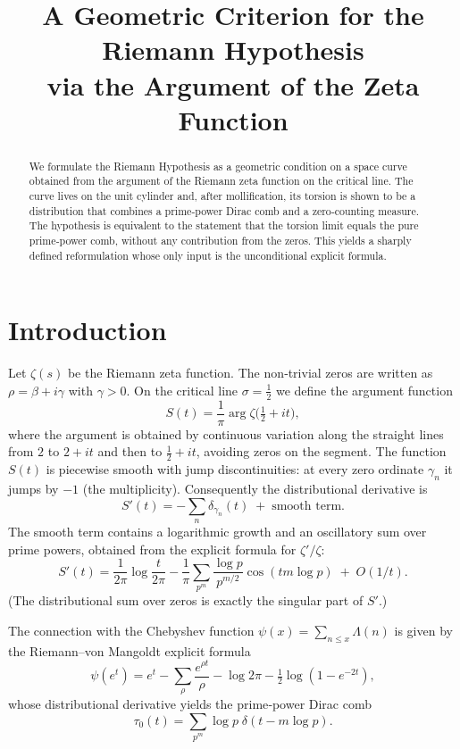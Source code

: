 \documentclass[12pt,a4paper]{article}
\title{\bf A Geometric Criterion for the Riemann Hypothesis\\ via the Argument of the Zeta Function}
\author{}
\date{}
\begin{document}
\maketitle

\begin{abstract}
We formulate the Riemann Hypothesis as a geometric condition on a space curve obtained from
the argument of the Riemann zeta function on the critical line.  The curve lives on the unit
cylinder and, after mollification, its torsion is shown to be a distribution that combines a
prime‑power Dirac comb and a zero‑counting measure.  The hypothesis is equivalent to the
statement that the torsion limit equals the pure prime‑power comb, without any contribution
from the zeros.  This yields a sharply defined reformulation whose only input is the
unconditional explicit formula.
\end{abstract}

\section{Introduction}

Let \(\zeta(s)\) be the Riemann zeta function.  The non‑trivial zeros are written as
\(\rho = \beta + i\gamma\) with \(\gamma>0\).  On the critical line \(\sigma = \tfrac12\) we
define the argument function
\[
S(t) = \frac1\pi \arg\zeta\bigl(\tfrac12+it\bigr),
\]
where the argument is obtained by continuous variation along the straight lines from \(2\) to
\(2+it\) and then to \(\tfrac12+it\), avoiding zeros on the segment.  The function \(S(t)\) is
piecewise smooth with jump discontinuities: at every zero ordinate \(\gamma_n\) it jumps by
\(-1\) (the multiplicity).  Consequently the distributional derivative is
\[
S'(t) = -\sum_{n} \delta_{\gamma_n}(t) \;+\; \text{smooth term}.
\]
The smooth term contains a logarithmic growth and an oscillatory sum over prime powers,
obtained from the explicit formula for \(\zeta'/\zeta\):
\[
S'(t) = \frac{1}{2\pi}\log\frac{t}{2\pi}
        -\frac1\pi \sum_{p^m}\frac{\log p}{p^{m/2}}\cos(t m\log p) \;+\; O(1/t).
\]
(The distributional sum over zeros is exactly the singular part of \(S'\).)

The connection with the Chebyshev function \(\psi(x)=\sum_{n\le x}\Lambda(n)\) is given by the
Riemann–von Mangoldt explicit formula
\[
\psi(e^t) = e^t - \sum_{\rho}\frac{e^{\rho t}}{\rho}
            - \log 2\pi - \tfrac12\log(1-e^{-2t}),
\]
whose distributional derivative yields the prime‑power Dirac comb
\[
\tau_0(t) = \sum_{p^m} \log p\; \delta(t - m\log p).
\]
\end{document}
